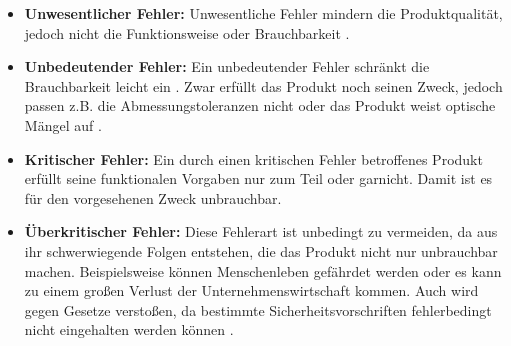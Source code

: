         \begin{itemize}
            \item \textbf{Unwesentlicher Fehler:} Unwesentliche Fehler mindern die Produktqualität, jedoch nicht die Funktionsweise oder Brauchbarkeit \cite{karger_pruftechnik_1985}.
            \item \textbf{Unbedeutender Fehler:} Ein unbedeutender Fehler schränkt die Brauchbarkeit leicht ein \cite{karger_pruftechnik_1985}. Zwar erfüllt das Produkt noch seinen Zweck, jedoch passen z.B. die Abmessungstoleranzen nicht oder das Produkt weist optische Mängel auf \cite{noauthor_fehlerklassifizierung_2022}.
            \item \textbf{Kritischer Fehler:} Ein durch einen kritischen Fehler betroffenes Produkt erfüllt seine funktionalen Vorgaben nur zum Teil oder garnicht. Damit ist es für den vorgesehenen Zweck unbrauchbar. \cite{karger_pruftechnik_1985}
            \item \textbf{Überkritischer Fehler:} Diese Fehlerart ist unbedingt zu vermeiden, da aus ihr schwerwiegende Folgen entstehen, die das Produkt nicht nur unbrauchbar machen. Beispielsweise können Menschenleben gefährdet werden oder es kann zu einem großen Verlust der Unternehmenswirtschaft kommen. \cite{karger_pruftechnik_1985} Auch wird gegen Gesetze verstoßen, da bestimmte Sicherheitsvorschriften fehlerbedingt nicht eingehalten werden können \cite{noauthor_fehlerklassifizierung_2022}.
        \end{itemize}